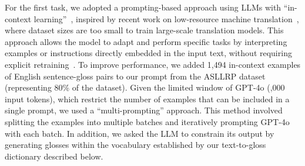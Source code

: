 For the first task, we adopted a prompting-based approach using LLMs with ``in-context learning''~\cite{xu2024misconfidence}, inspired by recent work on low-resource machine translation~\cite{guo2024teaching}, where dataset sizes are too small to train large-scale translation models. This approach allows the model to adapt and perform specific tasks by interpreting examples or instructions directly embedded in the input text, without requiring explicit retraining~\cite{brown2020language}. To improve performance, we added 1,494 in-context examples of English sentence-gloss pairs to our prompt from the ASLLRP dataset (representing 80\% of the dataset). Given the limited window of GPT-4o (,000 input tokens), which restrict the number of examples that can be included in a single prompt, we used a ``multi-prompting'' approach. This method involved splitting the examples into multiple batches and iteratively prompting GPT-4o with each batch. In addition, we asked the LLM to constrain its output by generating glosses within the vocabulary established by our text-to-gloss dictionary described below.

